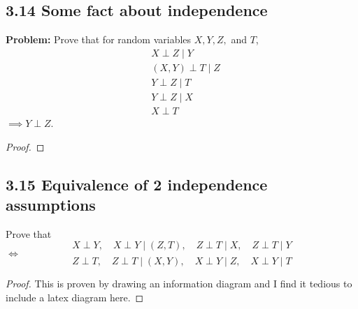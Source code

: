 \documentclass[../main.tex]{subfiles}
\begin{document}
 \subsection*{3.14 Some fact about independence}
 \textbf{Problem:} Prove that for random variables \(X, Y, Z,\) and \(T\),
\begin{align*}
&X \perp Z \mid Y \\
&(X, Y) \perp T \mid Z \\
&Y \perp Z \mid T \\
&Y \perp Z \mid X \\
&X \perp T
\end{align*}
\(\implies Y \perp Z\).
\begin{proof}
    
    
\end{proof}
 \subsection*{3.15 Equivalence of 2 independence assumptions}
 Prove that
\[
X \perp Y, \quad X \perp Y \mid (Z, T), \quad Z \perp T \mid X, \quad Z \perp T \mid Y
\]
\(\iff\)
\[
Z \perp T, \quad Z \perp T \mid (X, Y), \quad X \perp Y \mid Z, \quad X \perp Y \mid T
\]
\begin{proof}
This is proven by drawing an information diagram and I find it tedious to include a latex diagram here.

\end{proof}
\end{document}
